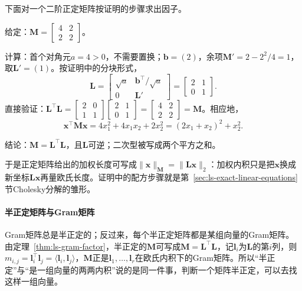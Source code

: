 下面对一个二阶正定矩阵按证明的步骤求出因子。
\begin{example}[二阶正定矩阵的配方因子]
\label{ex:ls-gram-factor-two-by-two}
给定：$\bm M=\left[\begin{smallmatrix}4&2\\2&2\end{smallmatrix}\right]$。

计算：首个对角元$a=4>0$，不需要置换；$\bm b=(2)$，余项$\bm M'=2-2^2/4=1$，取$\bm L'=(1)$。按证明中的分块形式，
\[
 \bm L=\begin{bmatrix}\sqrt a&\bm b^\top/\sqrt a\\ 0&\bm L'\end{bmatrix}=\begin{bmatrix}2&1\\0&1\end{bmatrix}.
\]
直接验证：$\bm L^\top\bm L=\left[\begin{smallmatrix}2&0\\1&1\end{smallmatrix}\right]\left[\begin{smallmatrix}2&1\\0&1\end{smallmatrix}\right]=\left[\begin{smallmatrix}4&2\\2&2\end{smallmatrix}\right]=\bm M$。相应地，
\[
 \bm x^\top\bm M\bm x=4x_1^2+4x_1x_2+2x_2^2=(2x_1+x_2)^2+x_2^2 .
\]

结论：$\bm M=\bm L^\top\bm L$，且$\bm L$可逆；二次型被写成两个平方之和。
\end{example}
于是正定矩阵给出的加权长度可写成$\lVert\bm x\rVert_{\bm M}=\lVert\bm L\bm x\rVert_2$：加权内积只是把$\bm x$换成新坐标$\bm L\bm x$再量欧氏长度。证明中的配方步骤就是第~\ref{sec:ls-exact-linear-equations}节Cholesky分解的雏形。

\paragraph{半正定矩阵与Gram矩阵}
Gram矩阵总是半正定的；反过来，每个半正定矩阵都是某组向量的Gram矩阵。由定理~\ref{thm:ls-gram-factor}，半正定的$\bm M$可写成$\bm M=\bm L^\top\bm L$，记$\bm l_i$为$\bm L$的第$i$列，则$m_{i,j}=\bm l_i^\top\bm l_j=\langle\bm l_i,\bm l_j\rangle$，$\bm M$正是$\bm l_1,\ldots,\bm l_r$在欧氏内积下的Gram矩阵。所以“半正定”与“是一组向量的两两内积”说的是同一件事，判断一个矩阵半正定，可以去找这样一组向量。

